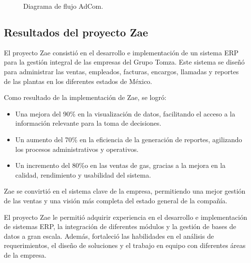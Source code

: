 \documentclass[protocolo.tex]{subfiles}
\begin{document}
\begin{figure}[h]  %
    \centering
    \caption{Diagrama de flujo AdCom.}
    \label{fig:mi-figura5}
\end{figure}

\subsection{Resultados del proyecto Zae}

El proyecto Zae consistió en el desarrollo e implementación de un sistema ERP para la gestión integral de las empresas del Grupo Tomza. Este sistema se diseñó para administrar las ventas, empleados, facturas, encargos, llamadas y reportes de las plantas en los diferentes estados de México.\vspace{4mm}

Como resultado de la implementación de Zae, se logró:

\begin{itemize}
\item Una mejora del 90\% en la visualización de datos,  facilitando el acceso a la información relevante para la toma de decisiones.
\item Un aumento del 70\% en la eficiencia de la generación de reportes,  agilizando los procesos administrativos y operativos.
\item Un incremento del 80\%o en las ventas de gas,  gracias a la mejora en la calidad, rendimiento y usabilidad del sistema.
\end{itemize}

Zae se convirtió en el sistema clave de la empresa,  permitiendo una mejor gestión de las ventas y una visión más completa del estado general de la compañía.\vspace{4mm}

El proyecto Zae le permitió adquirir experiencia en el desarrollo e implementación de sistemas ERP,  la integración de diferentes módulos y la gestión de bases de datos a gran escala. Además, fortaleció las habilidades en el análisis de requerimientos, el diseño de soluciones  y  el  trabajo  en  equipo  con  diferentes  áreas  de  la  empresa.\vspace{4mm}
\end{document}
